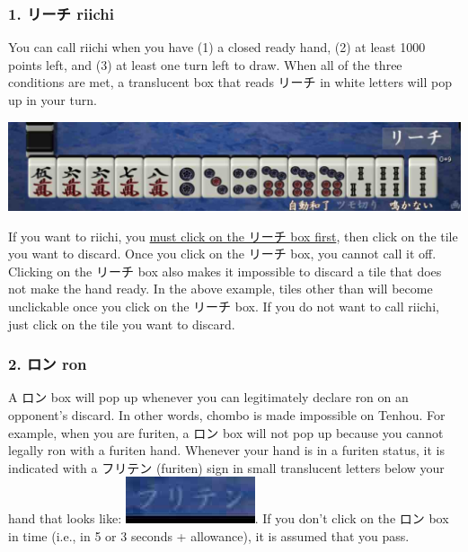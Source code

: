 \subsubsection{1. リーチ riichi }
You can call riichi when you have (1) a closed ready hand, (2) at least 1000 points left, and (3) at least one turn left to draw. When all of the three conditions are met, a translucent box that reads リーチ in white letters will pop up in your turn.
\begin{center}
\includegraphics[width=.7\textwidth,clip]{figs/riichi.jpg}
\end{center}
If you want to riichi, you \underline{must click on the リーチ box first}, then click on the tile you want to discard. Once you click on the リーチ box, you cannot call it off. Clicking on the リーチ box also makes it impossible to discard a tile that does not make the hand ready. In the above example, tiles other than {\LARGE {}} will become unclickable once you click on the リーチ box. If you do not want to call riichi, just click on the tile you want to discard.

\subsubsection{2. ロン {\jap ron} \textipa{[r\'\textopeno\ng]}}
A ロン box will pop up whenever you can legitimately declare {\jap ron} on an opponent's discard. In other words, {\jap chombo} is made impossible on {\jap Tenhou}. For example, when you are {\jap furiten}, a ロン box will not pop up because you cannot legally {\jap ron} with a {\jap furiten} hand. Whenever your hand is in a {\jap furiten} status, it is indicated with a フリテン ({\jap furiten}) sign in small translucent letters below your hand that looks like: \includegraphics[width=.12\textwidth,clip]{figs/furiten.jpg}.
If you don't click on the ロン box in time (i.e., in 5 or 3 seconds + allowance), it is assumed that you pass.

